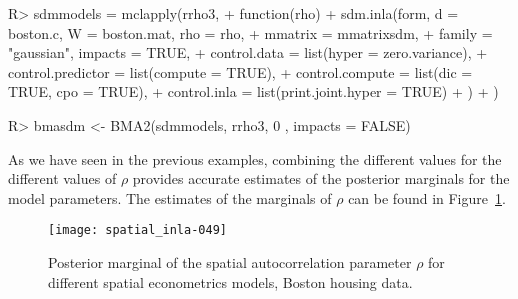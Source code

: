 \documentclass[article]{jss}
\begin{document}
\begin{Schunk}
\begin{Sinput}
R> sdmmodels = mclapply(rrho3,
+          function(rho) {
+                  sdm.inla(form, d = boston.c, W = boston.mat, rho = rho, 
+  			mmatrix = mmatrixsdm,
+                          family = "gaussian", impacts = TRUE,
+                          control.data = list(hyper = zero.variance),
+                          control.predictor = list(compute = TRUE),
+                          control.compute = list(dic = TRUE, cpo = TRUE),
+                          control.inla = list(print.joint.hyper = TRUE)
+                  )
+          })
\end{Sinput}
\end{Schunk}

\begin{Schunk}
\begin{Sinput}
R> bmasdm <- BMA2(sdmmodels, rrho3, 0 , impacts = FALSE)
\end{Sinput}
\end{Schunk}

As we have seen in the previous examples, combining the different values 
for the different values of $\rho$ provides accurate estimates of the posterior
marginals for the model parameters. The estimates of the marginals of
$\rho$ can be found in Figure~\ref{fig:pmargrho}.

\begin{figure}[h]
\begin{center}
\texttt{[image: spatial\_inla-049]}
\end{center}
\caption{Posterior marginal of the spatial autocorrelation parameter $\rho$
for different spatial econometrics models, Boston housing data.}
\label{fig:pmargrho}
\end{figure} 





%
%
\end{document}
